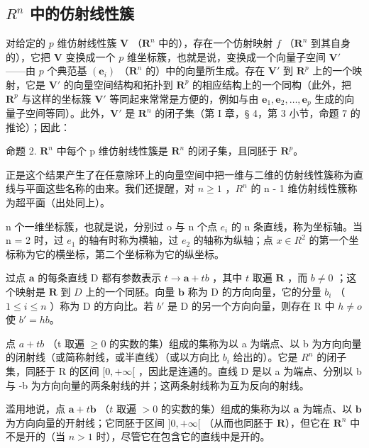 \subsection{\texorpdfstring{\(R^{n}\) 中的仿射线性簇}{R 的 n 次幂中的仿射线性簇}}

对给定的 \(p\) 维仿射线性簇 \(\mathbf{V}\) （\(\mathbf{R}^n\) 中的），存在一个仿射映射 \(f\) （\(\mathbf{R}^n\) 到其自身的），它把 \(\mathbf{V}\) 变换成一个 \(p\) 维坐标簇，也就是说，变换成一个向量子空间 \(\mathbf{V}'\) ——由 \(p\) 个典范基 \((\boldsymbol{e}_i)\) （\(\mathbf{R}^n\) 的）中的向量所生成。存在 \(\mathbf{V}'\) 到 \(\mathbf{R}^p\) 上的一个映射，它是 \(\mathbf{V}'\) 的向量空间结构和拓扑到 \(\mathbf{R}^p\) 的相应结构上的一个同构（此外，把 \(\mathbf{R}^p\) 与这样的坐标簇 \(\mathbf{V}'\) 等同起来常常是方便的，例如与由 \(\boldsymbol{e}_1, \boldsymbol{e}_2, \ldots, \boldsymbol{e}_p\) 生成的向量子空间等同）。此外，\(\mathbf{V}'\) 是 \(\mathbf{R}^n\) 的闭子集（第 I 章，§ 4，第 3 小节，命题 7 的推论）；因此：

命题 2. \(\mathbf{R}^n\) 中每个 p 维仿射线性簇是 \(\mathbf{R}^n\) 的闭子集，且同胚于 \(\mathbf{R}^p\)。

正是这个结果产生了在任意除环上的向量空间中把一维与二维的仿射线性簇称为直线与平面这些名称的由来。我们还提醒，对 \(n \geqslant 1\) ，\(R^{n}\) 的 n - 1 维仿射线性簇称为超平面（出处同上）。

n 个一维坐标簇，也就是说，分别过 o 与 n 个点 \(e_{i}\) 的 n 条直线，称为坐标轴。当 n = 2 时，过 \(e_{1}\) 的轴有时称为横轴，过 \(e_{2}\) 的轴称为纵轴；点 \(x \in R^{2}\) 的第一个坐标称为它的横坐标，第二个坐标称为它的纵坐标。

过点 \(\pmb{a}\) 的每条直线 D 都有参数表示 \(t \to \pmb{a} + tb\) ，其中 \(t\) 取遍 \(\mathbf{R}\) ，而 \(b \neq 0\) ；这个映射是 \(\mathbf{R}\) 到 \(D\) 上的一个同胚。向量 \(\pmb{b}\) 称为 D 的方向向量，它的分量 \(b_{i}\) （ \(1 \leqslant i \leqslant n\) ）称为 D 的方向比。若 \(b'\) 是 D 的另一个方向向量，则存在 R 中 \(h \neq o\) 使 \(b' = hb\)。

点 \(a + tb\) （t 取遍 \(\geqslant 0\) 的实数的集）组成的集称为以 a 为端点、以 b 为方向向量的闭射线（或简称射线，或半直线）（或以方向比 \(b_{i}\) 给出的）。它是 \(R^{n}\) 的闭子集，同胚于 R 的区间 \([0, +\infty[\) ，因此是连通的。直线 D 是以 a 为端点、分别以 b 与 -b 为方向向量的两条射线的并；这两条射线称为互为反向的射线。

滥用地说，点 \(\pmb{a} + t\pmb{b}\) （\(t\) 取遍 \(> 0\) 的实数的集）组成的集称为以 \(\pmb{a}\) 为端点、以 \(\pmb{b}\) 为方向向量的开射线；它同胚于区间 \(]0, +\infty[\) （从而也同胚于 \(\mathbf{R}\)），但它在 \(\mathbf{R}^n\) 中不是开的（当 \(n > 1\) 时），尽管它在包含它的直线中是开的。

